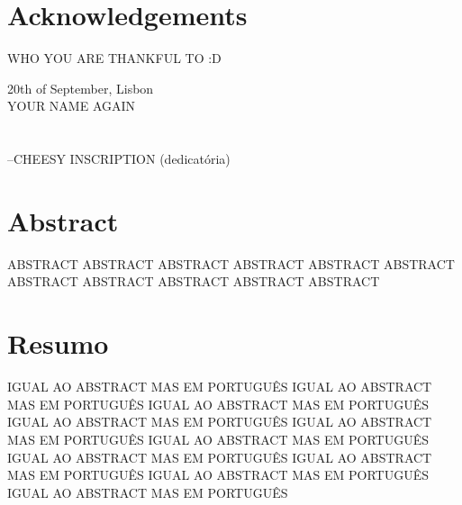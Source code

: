 \chapter*{Acknowledgements}
\thispagestyle{empty}

WHO YOU ARE THANKFUL TO :D

\vspace{15pt}
\vfill
\begin{flushright}
  \begin{minipage}{8cm}
    \begin{center}
    20th of September, Lisbon \\ 
	YOUR NAME AGAIN
    \end{center}
  \end{minipage}
\end{flushright}

\cleardoublepage

\chapter*{}
\thispagestyle{empty}
\vfill
\mbox{}
\vfill\Large
\begin{flushright}
  \begin{minipage}{8cm}
    \begin{center}

--CHEESY INSCRIPTION (dedicatória)

    \end{center}
  \end{minipage}
\end{flushright}
\normalsize\vfill

\cleardoublepage





\chapter*{Abstract}
\thispagestyle{empty}

ABSTRACT 
ABSTRACT 
ABSTRACT 
ABSTRACT 
ABSTRACT 
ABSTRACT 
ABSTRACT 
ABSTRACT 
ABSTRACT 
ABSTRACT 
ABSTRACT 


\newpage
\chapter*{Resumo}
\thispagestyle{empty}

IGUAL AO ABSTRACT MAS EM PORTUGUÊS
IGUAL AO ABSTRACT MAS EM PORTUGUÊS
IGUAL AO ABSTRACT MAS EM PORTUGUÊS
IGUAL AO ABSTRACT MAS EM PORTUGUÊS
IGUAL AO ABSTRACT MAS EM PORTUGUÊS
IGUAL AO ABSTRACT MAS EM PORTUGUÊS
IGUAL AO ABSTRACT MAS EM PORTUGUÊS
IGUAL AO ABSTRACT MAS EM PORTUGUÊS
IGUAL AO ABSTRACT MAS EM PORTUGUÊS
IGUAL AO ABSTRACT MAS EM PORTUGUÊS



